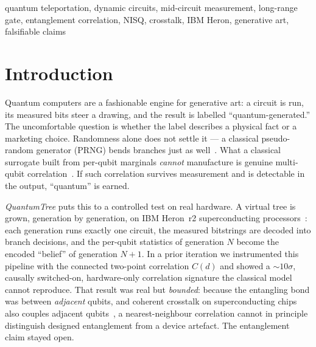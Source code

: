 \documentclass[conference]{IEEEtran}
\begin{document}
\begin{abstract}
simulation then anchors the claim: the teleport circuit is logically a CNOT (matching a
plain $\mathrm{CX}$ to within shot noise), and the ideal bond correlation is
\emph{negative} ($-0.29$ at $d{=}12$). Teleportation reproduces that correct negative sign
on hardware; the SWAP ladder does not --- its depth-$31$ routing washes the correlation to
a drift-dependent floor whose residual reads the \emph{wrong} sign. \textbf{In this
framing, teleportation is simply the better long-range gate: correct-signed, reproducible,
and constant-depth, where SWAP routing is decohered and sign-inverted by its own depth.}
The result is a hardware-grown genome carrying a real, designed, crosstalk-immune
long-range correlation --- a correlated quantum genome, not a decorated random one.
\end{abstract}

\begin{IEEEkeywords}
quantum teleportation, dynamic circuits, mid-circuit measurement, long-range gate,
entanglement correlation, NISQ, crosstalk, IBM Heron, generative art, falsifiable claims
\end{IEEEkeywords}

\section{Introduction}

Quantum computers are a fashionable engine for generative art: a circuit is run, its
measured bits steer a drawing, and the result is labelled ``quantum-generated.'' The
uncomfortable question is whether the label describes a physical fact or a marketing
choice. Randomness alone does not settle it --- a classical pseudo-random generator
(PRNG) bends branches just as well~\cite{nielsen2010}. What a classical surrogate built
from per-qubit marginals \emph{cannot} manufacture is genuine multi-qubit
correlation~\cite{horodecki2009}. If such correlation survives measurement and is
detectable in the output, ``quantum'' is earned.

\emph{QuantumTree} puts this to a controlled test on real hardware. A virtual tree is
grown, generation by generation, on IBM Heron~r2 superconducting
processors~\cite{ibmheron,kim2023}: each generation runs exactly one circuit, the measured
bitstrings are decoded into branch decisions, and the per-qubit statistics of generation
$N$ become the encoded ``belief'' of generation $N{+}1$. In a prior iteration we
instrumented this pipeline with the connected two-point correlation $C(d)$ and showed a
${\sim}10\sigma$, causally switched-on, hardware-only correlation signature the classical
model cannot reproduce. That result was real but \emph{bounded}: because the entangling
bond was between \emph{adjacent} qubits, and coherent crosstalk on superconducting chips
also couples adjacent qubits~\cite{sarovar2020}, a nearest-neighbour correlation cannot in
principle distinguish designed entanglement from a device artefact. The entanglement
claim stayed open.
\end{document}
